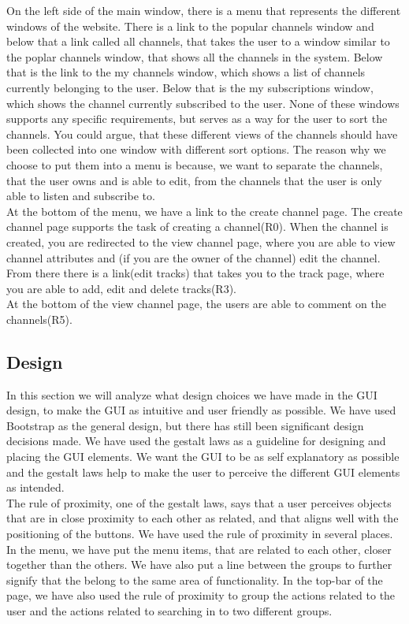 \documentclass[a4paper,11pt,report]{article}
\begin{document}
On the left side of the main window, there is a menu that represents the different windows of the website. There is a link to the popular channels window and below that a link called all channels, that takes the user to a window similar to the poplar channels window, that shows all the channels in the system. Below that is the link to the my channels window, which shows a list of channels currently belonging to the user. Below that is the my subscriptions window, which shows the channel currently subscribed to the user. None of these windows supports any specific requirements, but serves as a way for the user to sort the channels. You could argue, that these different views of the channels should have been collected into one window with different sort options. The reason why we choose to put them into a menu is because, we want to separate the channels, that the user owns and is able to edit, from the channels that the user is only able to listen and subscribe to.\\

At the bottom of the menu, we have a link to the create channel page. The create channel page supports the task of creating a channel(R0). When the channel is created, you are redirected to the view channel page, where you are able to view channel attributes and (if you are the owner of the channel) edit the channel. From there there is a link(edit tracks) that takes you to the track page, where you are able to add, edit and delete tracks(R3).\\

At the bottom of the view channel page, the users are able to comment on the channels(R5). \\

\subsection{Design}
In this section we will analyze what design choices we have made in the GUI design, to make the GUI as intuitive and user friendly as possible. We have used Bootstrap as the general design, but there has still been significant design decisions made. We have used the gestalt laws\cite{gestalt} as a guideline for designing and placing the GUI elements. We want the GUI to be as self explanatory as possible and the gestalt laws help to make the user to perceive the different GUI elements as intended. \\

The rule of proximity, one of the gestalt laws, says that a user perceives objects that are in close proximity to each other as related, and that aligns well with the positioning of the buttons. We have used the rule of proximity in several places. In the menu, we have put the menu items, that are related to each other, closer together than the others. We have also put a line between the groups to further signify that the belong to the same area of functionality. In the top-bar of the page, we have also used the rule of proximity to group the actions related to the user and the actions related to searching in to two different groups. \\
\end{document}
